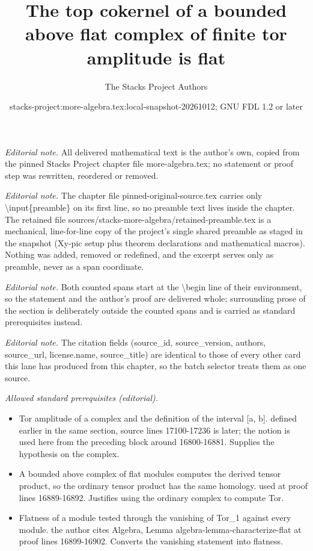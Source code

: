 \documentclass[10pt,a4paper]{amsart}
\title{The top cokernel of a bounded above flat complex of finite tor amplitude is flat}
\author{The Stacks Project Authors}
\date{stacks-project:more-algebra.tex:local-snapshot-20261012; GNU FDL 1.2 or later}
\theoremstyle{plain}
\theoremstyle{definition}
\theoremstyle{remark}
\numberwithin{equation}{subsection}
\begin{document}
\maketitle
\setcounter{subsection}{1}
\noindent\textit{Editorial note.} All delivered mathematical text is the author's own, copied from the pinned Stacks Project chapter file more-algebra.tex; no statement or proof step was rewritten, reordered or removed.\par\medskip
\noindent\textit{Editorial note.} The chapter file pinned-original-source.tex carries only \textbackslash{}input\{preamble\} on its first line, so no preamble text lives inside the chapter. The retained file sources/stacks-more-algebra/retained-preamble.tex is a mechanical, line-for-line copy of the project's single shared preamble as staged in the snapshot (Xy-pic setup plus theorem declarations and mathematical macros). Nothing was added, removed or redefined, and the excerpt serves only as preamble, never as a span coordinate.\par\medskip
\noindent\textit{Editorial note.} Both counted spans start at the \textbackslash{}begin line of their environment, so the statement and the author's proof are delivered whole; surrounding prose of the section is deliberately outside the counted spans and is carried as standard prerequisites instead.\par\medskip
\noindent\textit{Editorial note.} The citation fields (source\_id, source\_version, authors, source\_url, license.name, source\_title) are identical to those of every other card this lane has produced from this chapter, so the batch selector treats them as one source.\par\medskip
\noindent\textit{Allowed standard prerequisites (editorial).}\begin{itemize}
\item Tor amplitude of a complex and the definition of the interval [a, b]. defined earlier in the same section, source lines 17100-17236 is later; the notion is used here from the preceding block around 16800-16881. Supplies the hypothesis on the complex.
\item A bounded above complex of flat modules computes the derived tensor product, so the ordinary tensor product has the same homology. used at proof lines 16889-16892. Justifies using the ordinary complex to compute Tor.
\item Flatness of a module tested through the vanishing of Tor\_1 against every module. the author cites Algebra, Lemma algebra-lemma-characterize-flat at proof lines 16899-16902. Converts the vanishing statement into flatness.
\end{itemize}\medskip
\end{document}
